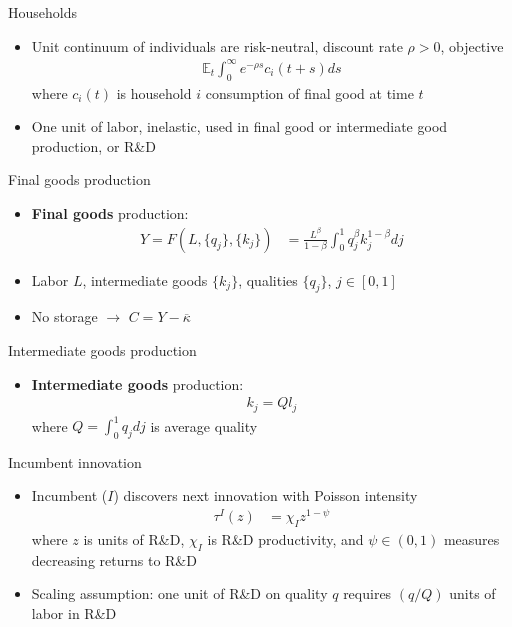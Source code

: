 \documentclass[english,usenames,dvipsnames]{beamer}
\begin{document}
\begin{frame}{Households}
\begin{itemize}
\item Unit continuum of individuals are risk-neutral, discount rate $\rho > 0$, objective
\begin{align*}
\mathbb{E}_t \int_0^{\infty} e^{-\rho s} c_i(t+s) ds
\end{align*}
where $c_i(t)$ is household $i$ consumption of final good at time $t$
\item One unit of labor, inelastic, used in final good or intermediate good production, or R\&D
\end{itemize}
\end{frame}

\begin{frame}{Final goods production}
\begin{itemize}
\item \textbf{\alert{Final goods}} production:
\begin{align*}
Y = F(L,\{q_j\},\{k_j\}) &= \frac{L^{\beta}}{1-\beta} \int_0^1 q_j^{\beta} k_j^{1-\beta}  dj 
\end{align*}
\item Labor $L$, intermediate goods $\{k_j\}$, qualities $\{q_j\}$, $j \in [0,1]$
\item No storage $\rightarrow$ $C = Y - \overline{\kappa}$
\end{itemize}
\end{frame}

\begin{frame}{Intermediate goods production}
\begin{itemize}
\item \textbf{\alert{Intermediate goods}} production:
\begin{align*}
k_j = Q l_j
\end{align*}
where $Q = \int_0^1 q_j dj$ is average quality
\end{itemize}
\end{frame}

\begin{frame}{Incumbent innovation}
\begin{itemize}
\item Incumbent ($I$) discovers next innovation with Poisson intensity
\begin{align*}
\tau^I(z) &= \chi_I z^{1-\psi}
\end{align*}
where $z$ is units of R\&D, $\chi_I$ is R\&D productivity, and $\psi \in (0,1)$ measures decreasing returns to R\&D 
\item Scaling assumption: one unit of R\&D on quality $q$ requires $(q/Q)$ units of labor in R\&D
\end{itemize}
\end{frame}
\end{document}
